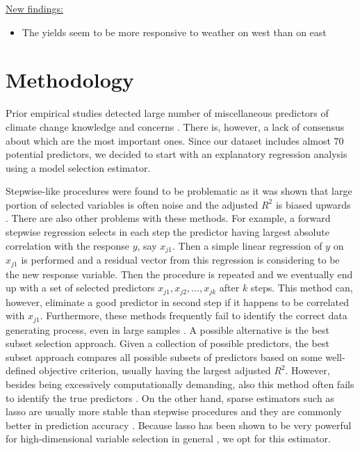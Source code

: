 \documentclass[a4paper,12pt]{article}
\begin{document}
\underline{New findings:}

\begin{itemize}
\item The yields seem to be more responsive to weather on west than on east
\end{itemize}
\normalsize
\FloatBarrier
\section{Methodology}\label{Method}

Prior empirical studies detected large number of miscellaneous predictors of climate change knowledge and concerns \citetext{e.g. \citealt*{Leiserowitz2015, Hamilton2011, McCright2010, Morrison2015}}. There is, however, a lack of consensus about which are the most important ones. Since our dataset includes almost $70$ potential predictors, we decided to start with an explanatory regression analysis using a model selection estimator.

Stepwise-like procedures were found to be problematic as it was shown that large portion of selected variables is often noise and the adjusted $R^2$ is biased upwards \citep{Flack1987}. There are also other problems with these methods. For example, a forward stepwise regression selects in each step the predictor having largest absolute correlation with the response $y$, say $x_{j1}$. Then a simple linear regression of $y$ on $x_{j1}$ is performed and a residual vector from this regression is considering to be the new response variable. Then the procedure is repeated and we eventually end up with a set of selected predictors $x_{j1}, x_{j2},...,x_{jk}$ after $k$ steps. This method can, however, eliminate a good predictor in second step if it happens to be correlated with $x_{j1}$.  Furthermore, these methods frequently fail to identify the correct data generating process, even in large samples \citep{Austin2008}. A possible alternative is the best subset selection approach. Given a collection of possible predictors, the best subset approach compares all possible subsets of predictors based on some well-defined objective criterion, usually having the largest adjusted $R^2$. However, besides being excessively computationally demanding, also this method often fails to identify the true predictors \citep{Flack1987}. On the other hand, sparse estimators such as lasso \citep{tibshirani96} are usually more stable than stepwise procedures and they are commonly better in prediction accuracy \citep{statisHighDimData}. Because lasso has been shown to be very powerful for high-dimensional variable selection in general \citep{pValsLasso}, we opt for this estimator. 
\end{document}
